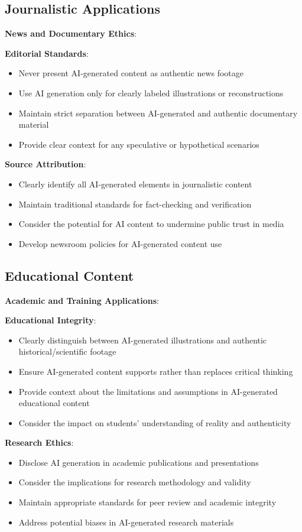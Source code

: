 \subsection{Journalistic Applications}
\textbf{News and Documentary Ethics}:

\textbf{Editorial Standards}:
\begin{itemize}
\item Never present AI-generated content as authentic news footage
\item Use AI generation only for clearly labeled illustrations or reconstructions
\item Maintain strict separation between AI-generated and authentic documentary material
\item Provide clear context for any speculative or hypothetical scenarios
\end{itemize}

\textbf{Source Attribution}:
\begin{itemize}
\item Clearly identify all AI-generated elements in journalistic content
\item Maintain traditional standards for fact-checking and verification
\item Consider the potential for AI content to undermine public trust in media
\item Develop newsroom policies for AI-generated content use
\end{itemize}

\subsection{Educational Content}
\textbf{Academic and Training Applications}:

\textbf{Educational Integrity}:
\begin{itemize}
\item Clearly distinguish between AI-generated illustrations and authentic historical/scientific footage
\item Ensure AI-generated content supports rather than replaces critical thinking
\item Provide context about the limitations and assumptions in AI-generated educational content
\item Consider the impact on students' understanding of reality and authenticity
\end{itemize}

\textbf{Research Ethics}:
\begin{itemize}
\item Disclose AI generation in academic publications and presentations
\item Consider the implications for research methodology and validity
\item Maintain appropriate standards for peer review and academic integrity
\item Address potential biases in AI-generated research materials
\end{itemize}

